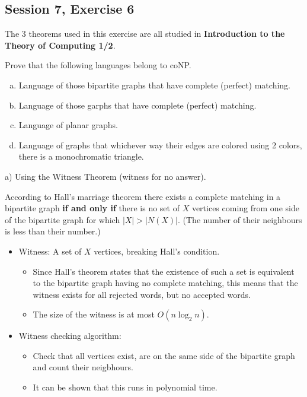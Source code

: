\subsection {Session 7, Exercise 6}

The 3 theorems used in this exercise are all studied in \textbf{Introduction to the Theory of Computing 1/2}.


Prove that the following languages belong to coNP.
\begin{enumerate}[a)]
    \item Language of those bipartite graphs that have complete (perfect) matching.
    \item Language of those garphs that have complete (perfect) matching.
    \item Language of planar graphs.
    \item Language of graphs that whichever way their edges are colored using 2 colors, there is a monochromatic triangle.
\end{enumerate}


a) Using the Witness Theorem (witness for no answer).

According to Hall's marriage theorem there exists a complete matching in a bipartite graph \textbf{if and only if} there is no set of $X$ vertices coming from one side of the bipartite graph for which $|X| > |N(X)|$. (The number of their neighbours is less than their number.)

\begin{itemize}
    \item Witness: A set of $X$ vertices, breaking Hall's condition.
        \begin{itemize}
            \item Since Hall's theorem states that the existence of such a set is equivalent to the bipartite graph having no complete matching, this means that the witness exists for all rejected words, but no accepted words.
            \item The size of the witness is at most $O(n\log_{2}n)$.
        \end{itemize}
    \item Witness checking algorithm:
    \begin{itemize}
        \item Check that all vertices exist, are on the same side of the bipartite graph and count their neigbhours.
        \item It can be shown that this runs in polynomial time.
    \end{itemize}
\end{itemize}

